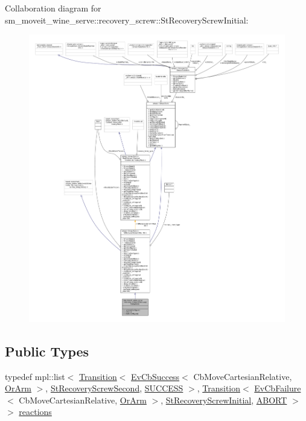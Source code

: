 Collaboration diagram for sm\+\_\+moveit\+\_\+wine\+\_\+serve\+:\+:recovery\+\_\+screw\+:\+:St\+Recovery\+Screw\+Initial\+:
\nopagebreak
\begin{figure}[H]
\begin{center}
\leavevmode
\includegraphics[width=350pt]{structsm__moveit__wine__serve_1_1recovery__screw_1_1StRecoveryScrewInitial__coll__graph}
\end{center}
\end{figure}
\subsection*{Public Types}
\begin{DoxyCompactItemize}
\item 
typedef mpl\+::list$<$ \hyperlink{classsmacc_1_1Transition}{Transition}$<$ \hyperlink{structsmacc_1_1EvCbSuccess}{Ev\+Cb\+Success}$<$ Cb\+Move\+Cartesian\+Relative, \hyperlink{classsm__moveit__wine__serve_1_1OrArm}{Or\+Arm} $>$, \hyperlink{structsm__moveit__wine__serve_1_1recovery__screw_1_1StRecoveryScrewSecond}{St\+Recovery\+Screw\+Second}, \hyperlink{structsmacc_1_1default__transition__tags_1_1SUCCESS}{S\+U\+C\+C\+E\+SS} $>$, \hyperlink{classsmacc_1_1Transition}{Transition}$<$ \hyperlink{structsmacc_1_1EvCbFailure}{Ev\+Cb\+Failure}$<$ Cb\+Move\+Cartesian\+Relative, \hyperlink{classsm__moveit__wine__serve_1_1OrArm}{Or\+Arm} $>$, \hyperlink{structsm__moveit__wine__serve_1_1recovery__screw_1_1StRecoveryScrewInitial}{St\+Recovery\+Screw\+Initial}, \hyperlink{structsmacc_1_1default__transition__tags_1_1ABORT}{A\+B\+O\+RT} $>$ $>$ \hyperlink{structsm__moveit__wine__serve_1_1recovery__screw_1_1StRecoveryScrewInitial_a4eec45a22fd1b591bbcc7d0ac70cf886}{reactions}
\end{DoxyCompactItemize}
